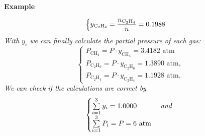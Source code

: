 \begin{MyExample}{\begin{center}{\bf Example}\end{center}}
\begin{example}
\begin{displaymath}
\begin{cases}
           y_{\text{C}_{2}\text{H}_{4}} = \frc{n_{\text{C}_{2}\text{H}_{4}}}{n} = 0.1988. 
         \end{cases}
       \end{displaymath}
       {\it With $y_{i}$ we can finally calculate the partial pressure of each gas:}
       \begin{displaymath}
         \begin{cases}
           P_{\text{CH}_{4}} = P\cdot y_{\text{CH}_{4}} = 3.4182\text{ atm}  \\
           P_{\text{C}_{2}\text{H}_{6}} = P\cdot y_{\text{C}_{2}\text{H}_{6}} = 1.3890\text{ atm},  \\
           P_{\text{C}_{2}\text{H}_{4}} = P\cdot y_{\text{C}_{2}\text{H}_{4}} = 1.1928\text{ atm}. 
         \end{cases}
       \end{displaymath}
       {\it We can check if the calculations are correct by}
       \begin{displaymath}
         \begin{cases}
           \summation[y_{i}]{i=1}{3} = 1.0000  & \textit{ and } \\
           \summation[P_{i}]{i=1}{3} = P = 6\text{ atm} & \\
         \end{cases}
       \end{displaymath}
           
     \end{example}
   \end{MyExample}
\medskip

